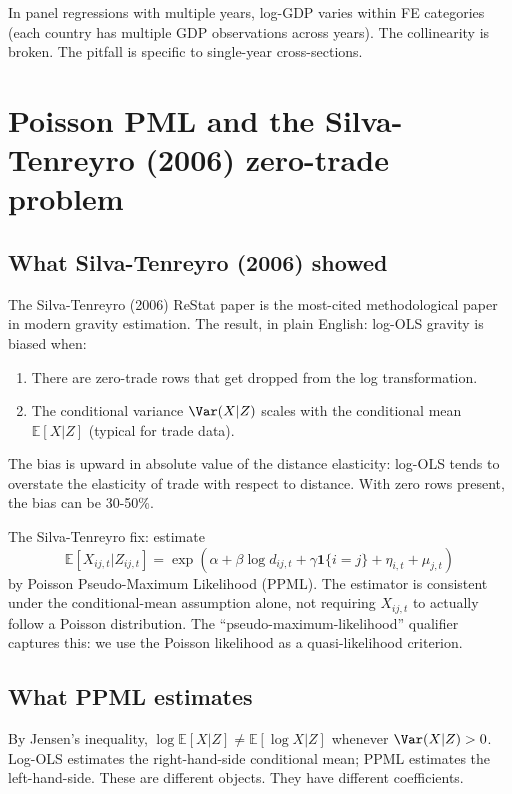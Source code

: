 \documentclass[11pt,letterpaper,oneside]{book}
\theoremstyle{definition}
\theoremstyle{remark}
\newcommand{\E}{\mathbb{E}}
\begin{document}
In panel regressions with multiple years, log-GDP varies within FE
categories (each country has multiple GDP observations across years).
The collinearity is broken. The pitfall is specific to single-year
cross-sections.

\chapter{Poisson PML and the Silva-Tenreyro (2006) zero-trade problem}
\label{ch:ppml}

\section{What Silva-Tenreyro (2006) showed}

The Silva-Tenreyro (2006) ReStat paper is the most-cited methodological
paper in modern gravity estimation. The result, in plain English:
log-OLS gravity is biased when:
\begin{enumerate}
  \item There are zero-trade rows that get dropped from the log
    transformation.
  \item The conditional variance $\Var(X|Z)$ scales with the
    conditional mean $\E[X|Z]$ (typical for trade data).
\end{enumerate}

The bias is upward in absolute value of the distance elasticity:
log-OLS tends to overstate the elasticity of trade with respect to
distance. With zero rows present, the bias can be 30-50\%.

The Silva-Tenreyro fix: estimate
\begin{equation}
\E[X_{ij,t}|Z_{ij,t}] = \exp\left(\alpha + \beta \log d_{ij,t} + \gamma \mathbf{1}\{i=j\} + \eta_{i,t} + \mu_{j,t}\right)
\end{equation}
by Poisson Pseudo-Maximum Likelihood (PPML). The estimator is
consistent under the conditional-mean assumption alone, not requiring
$X_{ij,t}$ to actually follow a Poisson distribution. The
``pseudo-maximum-likelihood'' qualifier captures this: we use the
Poisson likelihood as a quasi-likelihood criterion.

\section{What PPML estimates}

By Jensen's inequality, $\log \E[X|Z] \neq \E[\log X|Z]$ whenever
$\Var(X|Z) > 0$. Log-OLS estimates the right-hand-side conditional
mean; PPML estimates the left-hand-side. These are different objects.
They have different coefficients.
\end{document}

